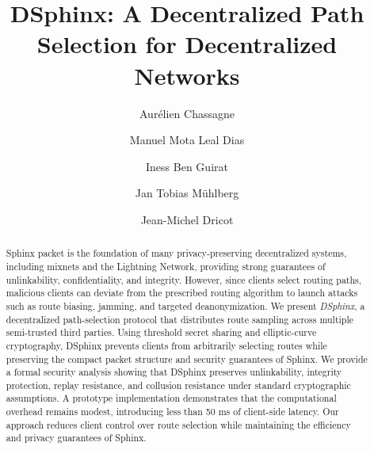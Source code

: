 \documentclass[runningheads]{llncs}
\begin{document}
\title{DSphinx: A Decentralized Path Selection for Decentralized Networks}

\author{
    Aurélien Chassagne \and
    Manuel Mota Leal Dias \and
    Iness Ben Guirat \and
    Jan Tobias Mühlberg \and
    Jean-Michel Dricot
}
%
%
%

\maketitle

\begin{abstract}
Sphinx packet is the foundation of many privacy-preserving decentralized systems, including mixnets and the Lightning Network, providing strong guarantees of unlinkability, confidentiality, and integrity. 
However, since clients select routing paths, malicious clients can deviate from the prescribed routing algorithm to launch attacks such as route biasing, jamming, and targeted deanonymization.
We present \emph{DSphinx}, a decentralized path-selection protocol that distributes route sampling across multiple semi-trusted third parties. 
Using threshold secret sharing and elliptic-curve cryptography, DSphinx prevents clients from arbitrarily selecting routes while preserving the compact packet structure and security guarantees of Sphinx. 
We provide a formal security analysis showing that DSphinx preserves unlinkability, integrity protection, replay resistance, and collusion resistance under standard cryptographic assumptions. 
A prototype implementation demonstrates that the computational overhead remains modest, introducing less than 50 ms of client-side latency. 
Our approach reduces client control over route selection while maintaining the efficiency and privacy guarantees of Sphinx.
\end{abstract}

\newcommand{\artifact}[0]{\url{https://github.com/AurelienCha/Decentralized-Sphinx.git}}
\end{document}
